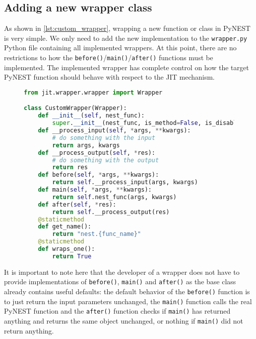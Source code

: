\subsection{Adding a new wrapper class}

As shown in \autoref{lst:custom_wrapper}, wrapping a new function or class in PyNEST is very simple. We only need to add the new implementation to the \texttt{wrapper.py} Python file containing all implemented wrappers. At this point, there are no restrictions to how the \texttt{before()}/\texttt{main()}/\texttt{after()} functions must be implemented. The implemented wrapper has complete control on how the target PyNEST function should behave with respect to the JIT mechanism.

\begin{figure}[ht!]
\centering
 \begin{lstlisting}[language=Python, label=lst:custom_wrapper, caption={CustomWrapper example}]
from jit.wrapper.wrapper import Wrapper

class CustomWrapper(Wrapper):
    def __init__(self, nest_func):
        super.__init__(nest_func, is_method=False, is_disabled=False)
    def __process_input(self, *args, **kwargs):
        # do something with the input
        return args, kwargs
    def __process_output(self, *res):
        # do something with the output
        return res
    def before(self, *args, **kwargs):
        return self.__process_input(args, kwargs)
    def main(self, *args, **kwargs):
        return self.nest_func(args, kwargs)
    def after(self, *res):
        return self.__process_output(res)
    @staticmethod
    def get_name():
        return "nest.{func_name}"
    @staticmethod
    def wraps_one():
        return True
\end{lstlisting}
\end{figure}


It is important to note here that the developer of a wrapper does not have to provide implementations of \texttt{before()}, \texttt{main()} and \texttt{after()} as the base class already contains useful defaults: the default behavior of the \texttt{before()} function is to just return the input parameters unchanged, the \texttt{main()} function calls the real PyNEST function and the \texttt{after()} function checks if \texttt{main()} has returned anything and returns the same object unchanged, or nothing if \texttt{main()} did not return anything.

